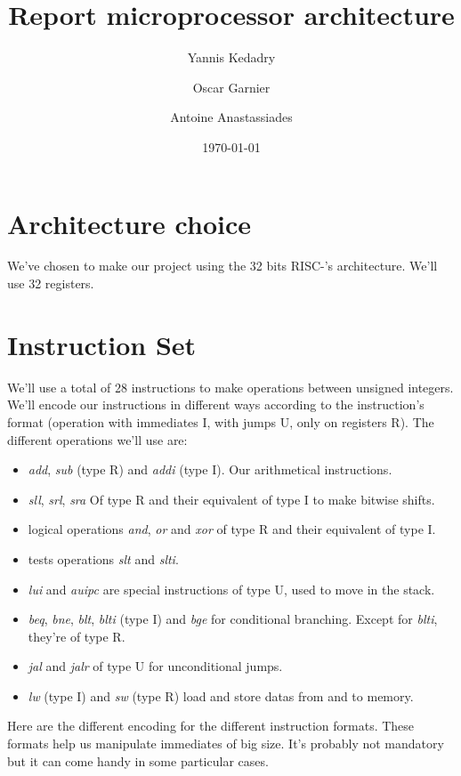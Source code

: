 \documentclass{article}
\title{Report microprocessor architecture}
\author{Yannis Kedadry \and Oscar Garnier \and Antoine Anastassiades }
\date{\today}
\newcommand{\RNum}[1]{\uppercase\expandafter{\romannumeral #1\relax}}
\newcommand{\risc}{RISC-\RNum{5}}
\begin{document}
\maketitle

\section{Architecture choice}
We've chosen to make our project using the 32 bits \risc{}'s architecture. We'll use 32 registers.

\section{Instruction Set}
We'll use a total of 28 instructions to make operations between unsigned integers. We'll encode our instructions in different
ways according to the instruction's format (operation with immediates I, with jumps U, only on registers R).
The different operations we'll use are:
\begin{itemize}
	\item \emph{add}, \emph{sub} (type R) and \emph{addi} (type I). Our arithmetical instructions.
	\item \emph{sll}, \emph{srl}, \emph{sra}  Of type R and their equivalent of type I to make bitwise shifts.
	\item logical operations \emph{and}, \emph{or} and \emph{xor} of type R and their equivalent of type I.
	\item tests operations \emph{slt} and \emph{slti}.
	\item \emph{lui} and \emph{auipc} are special instructions of type U, used to move in the stack.
	\item \emph{beq}, \emph{bne}, \emph{blt}, \emph{blti} (type I) and \emph{bge} for conditional branching. Except for \emph{blti}, they're of type R.
	\item \emph{jal} and \emph{jalr} of type U for unconditional jumps.
	\item \emph{lw} (type I) and \emph{sw} (type R) load and store datas from and to memory.
\end{itemize}

Here are the different encoding for the different instruction formats. These formats help us manipulate immediates of big size.
It's probably not mandatory but it can come handy in some particular cases.
\end{document}
